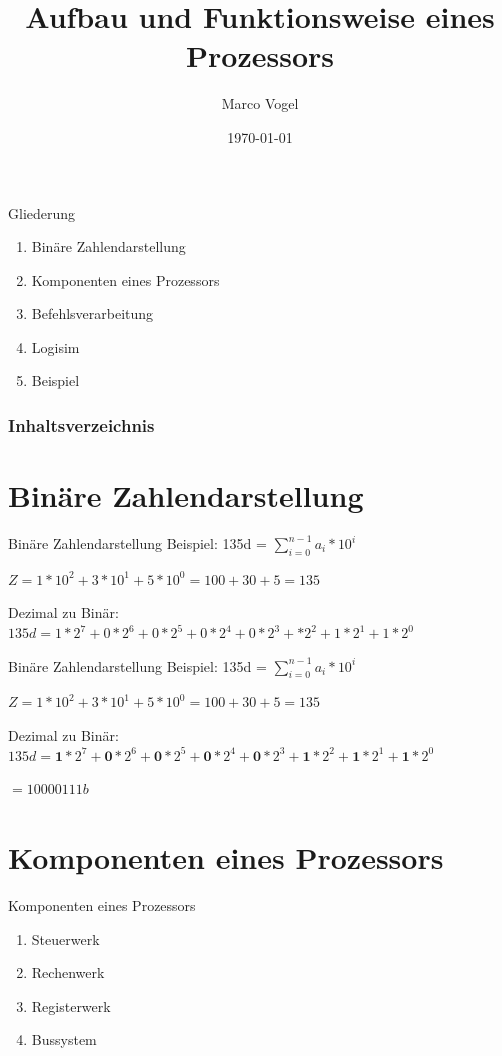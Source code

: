 \documentclass[handout]{beamer}
\title{Aufbau und Funktionsweise eines Prozessors}
\author{Marco Vogel}
\institute{Hochschule Hof}
\date{\today}
\begin{document}
\begin{frame}
\titlepage
\end{frame}

\begin{frame}{Gliederung}
\begin{enumerate}
\item{Bin\"are Zahlendarstellung}
\item{Komponenten eines Prozessors}
\item{Befehlsverarbeitung}
\item{Logisim}
\item{Beispiel}
\end{enumerate}
\end{frame}

\begin{frame}
\frametitle{Inhaltsverzeichnis}
\tableofcontents
\end{frame}

\section{Bin\"are Zahlendarstellung}
\begin{frame}[t]{Bin\"are Zahlendarstellung}
Beispiel: 135d = $\sum\limits_{i=0}^{n-1} a_i * 10^i$
\newline
\par\smallskip
$Z=1*10^2+3*10^1+5*10^0 = 100+30+5 = 135$
\par\smallskip\pause
Dezimal zu Bin\"ar: \centering $135d = 1*2^7+0*2^6+0*2^5+0*2^4+0*2^3+*2^2+1*2^1+1*2^0$\newline
\end{frame}


\begin{frame}[t]{Bin\"are Zahlendarstellung}
Beispiel: 135d = $\sum\limits_{i=0}^{n-1} a_i * 10^i$
\newline
\par\smallskip
$Z=1*10^2+3*10^1+5*10^0 = 100+30+5 = 135$
\par\smallskip
Dezimal zu Bin\"ar:\centering\\ $135d = \textbf{1}*2^7+\textbf{0}*2^6+\textbf{0}*2^5+\textbf{0}*2^4+\textbf{0}*2^3+\textbf{1}*2^2+\textbf{1}*2^1+\textbf{1}*2^0$\newline \par\smallskip\pause
$  = 10000111b$\centering
\end{frame}

\section{Komponenten eines Prozessors}
\begin{frame}{Komponenten eines Prozessors}
\begin{enumerate}
\large\item{Steuerwerk}\smallskip
\item{Rechenwerk}\smallskip
\item{Registerwerk}\smallskip
\item{Bussystem}\smallskip
\end{enumerate}
\end{frame}
\end{document}
